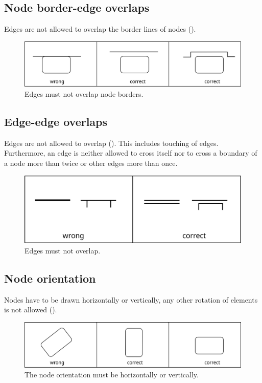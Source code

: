 \subsection{Node border-edge overlaps}

Edges are not allowed to overlap the border lines of nodes ().

\begin{figure}[htb]
  \centering
  \includegraphics[scale=0.3]{images/layout-node-border-edge}
  \caption{Edges must not overlap node borders.}\label{fig:layout3}
\end{figure}

\subsection{Edge-edge overlaps}

Edges are not allowed to overlap (). This includes touching of edges.
Furthermore, an edge is neither allowed to cross itself nor to cross
a boundary of a node more than twice or other edges more than once.

\begin{figure}[htb]
  \centering
  \includegraphics[scale=0.3]{images/layout-edge-edge}
  \caption{Edges must not overlap.}\label{fig:layout4}
\end{figure}

\subsection{Node orientation}

Nodes have to be drawn horizontally or vertically, any other
rotation of elements is not allowed ().

\begin{figure}[htb]
  \centering
  \includegraphics[scale=0.3]{images/layout-orientation}
  \caption{The node orientation must be horizontally or
  vertically.}\label{fig:layout5}
\end{figure}

